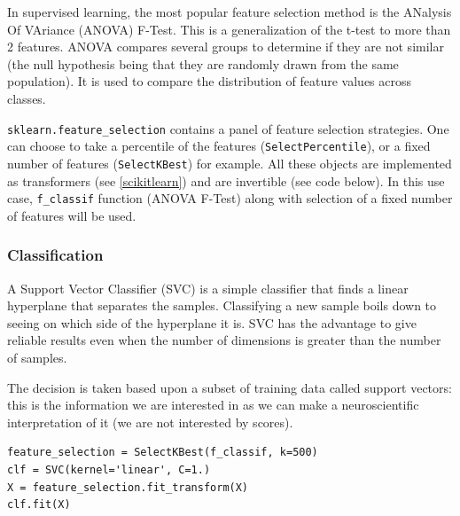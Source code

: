 \documentclass{frontiersSCNS} %
\begin{document}
In supervised learning, the most popular feature selection method is the
ANalysis Of VAriance (ANOVA) F-Test. This is a generalization of the t-test to
more than 2 features. ANOVA compares several
groups to determine if they are not similar (the null hypothesis being that they
are randomly drawn from the same population). It is used to compare the distribution
of feature values across classes.

\verb!sklearn.feature_selection! contains a panel of feature selection
strategies. One can choose to take a percentile of the features
(\verb!SelectPercentile!), or a fixed number of features (\verb!SelectKBest!)
for example. All these objects are implemented as transformers (see
\ref{scikitlearn}) and are invertible (see code below).
In this use case, \verb!f_classif! function (ANOVA F-Test) along with selection
of a fixed number of features will be used.

\subsubsection{Classification}

A Support Vector Classifier (SVC) is a simple classifier that finds a linear
hyperplane that separates the samples. Classifying a new sample boils down to
seeing on which side of the hyperplane it is. SVC has the advantage to
give reliable results even when the number of dimensions is greater than the
number of samples.

The decision is taken based upon a subset of training data called support
vectors: this is the information we are interested in as we can make a
neuroscientific interpretation of it (we are not interested by scores).

\begin{lstlisting}
feature_selection = SelectKBest(f_classif, k=500)
clf = SVC(kernel='linear', C=1.)
X = feature_selection.fit_transform(X)
clf.fit(X)
\end{lstlisting}


\end{document}
